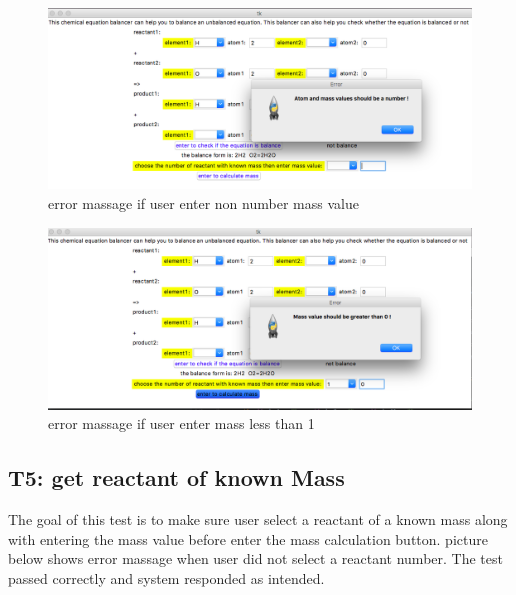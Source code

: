 \documentclass[12pt, titlepage]{article}
\begin{document}
 \begin{figure}[H]
 \begin{center}
 \includegraphics [width=\textwidth]{massnotnumber}
 \caption{\label{ Figure 9:} error massage if user enter non number mass value}
 \end{center}
 \end{figure}
 
\begin{figure}[H]
 \begin{center}
 \includegraphics [width=\textwidth]{massnegative}
 \caption{\label{ Figure 10:} error massage if user enter mass less than 1}
 \end{center}
 \end{figure}
 
 
 \subsection{T5: get reactant of known Mass}

The goal of this test is to make sure user select a reactant of a known mass along with entering the mass value before enter the mass calculation button. picture below shows error massage when user did not select a reactant number. The test passed correctly and system responded as intended. 
\end{document}
